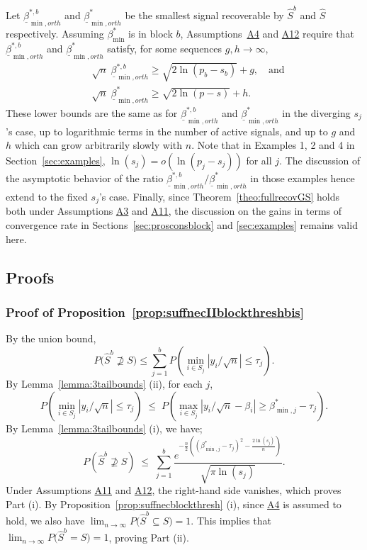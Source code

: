 \documentclass[bj,authoryear]{imsart}
\theoremstyle{plain}
\begin{document}
Let $\underline{\beta}_{\min,orth}^{*, b}$ and $\underline{\beta}_{\min , orth}^*$ be the smallest signal recoverable by $\hat{S}^b$ and $\hat{S}$ respectively. Assuming $\beta_{\min}^*$ is in block $b$, Assumptions~\hyperlink{lab:A4}{A4} and \hyperlink{lab:A12}{A12} require that $\underline{\beta}_{\min,orth}^{*, b}$ and $\underline{\beta}_{\min,orth }^*$ satisfy, for some sequences $g, h \rightarrow \infty$,
\begin{align*}
& \sqrt{n}\;\underline{\beta}_{\min ,orth}^{*, b} \geq \sqrt{2\ln \left(p_b-s_b\right)}+g, \quad\text{and}\\
& \sqrt{n}\;\underline{\beta}_{\min,orth}^* \geq \sqrt{2\ln(p-s)}+h.
\end{align*}
These lower bounds are the same as for $\underline{\beta}_{\min ,orth}^{*, b}$ and $ \underline{\beta}_{\min, orth}^*$ in the diverging $s_j$'s case, up to logarithmic terms in the number of active signals, and up to $g$ and $h$ which can grow arbitrarily slowly with $n$. Note that in Examples 1, 2 and 4 in Section~\ref{sec:examples}, $\ln(s_j)=o(\ln(p_j-s_j))$ for all $j$. The discussion of the asymptotic behavior of the ratio $\underline{\beta}_{\min ,orth}^{*, b} / \underline{\beta}_{\min, orth}^*$ in those examples hence extend to the fixed $s_j$'s case. Finally, since Theorem~\ref{theo:fullrecovGS} holds both under Assumptions \hyperlink{lab:A3}{A3} and \hyperlink{lab:A11}{A11}, the discussion on the gains in terms of convergence rate in Sections~\ref{sec:prosconsblock} and \ref{sec:examples} remains valid here.

\subsection{Proofs}

\subsubsection{Proof of Proposition~\ref{prop:suffnecIIblockthreshbis}}
 By the union bound, 
$$P\big(\hat{S}^{b} \not\supseteq S\big)\leq \sum_{j=1}^b  P\left(\min_{i\in S_j}|y_i/\sqrt{n}|\leq\tau_j\right).$$ 
By Lemma~\ref{lemma:3tailbounds} (ii), for each $j$,	
$$P\left(\min_{i\in S_j}|y_i/\sqrt{n}|\leq\tau_j\right)\;\leq\; P\left(\max_{i\in S_j}|y_i/\sqrt{n}-\beta_i| \geq\beta_{\min,j}^*-\tau_j \right).$$ By Lemma~\ref{lemma:3tailbounds} (i), we have;
\begin{equation}
P\left(\hat{S}^{b}\not\supseteq S \right) \;\leq\;\sum_{j=1}^b\frac{e^{-\tfrac{n}{2}\left((\beta^*_{\min,j}-\tau_j)^2-\tfrac{2\ln(s_j)}{n}\right)}}{\sqrt{\pi\ln(s_j)}}.		
\end{equation}
Under Assumptions \hyperlink{lab:A11}{A11} and \hyperlink{lab:A12}{A12}, %
the right-hand side vanishes, which proves Part (i). By Proposition~\ref{prop:suffnecblockthresh} (i), since \hyperlink{lab:A4}{A4} is assumed to hold, we also have $\lim_{n\to\infty}P\big(\hat{S}^{b} \subseteq S\big)=1$. This implies that $\lim_{n\to\infty}P\big(\hat{S}^{b} = S\big)= 1$, proving Part (ii).
\end{document}

